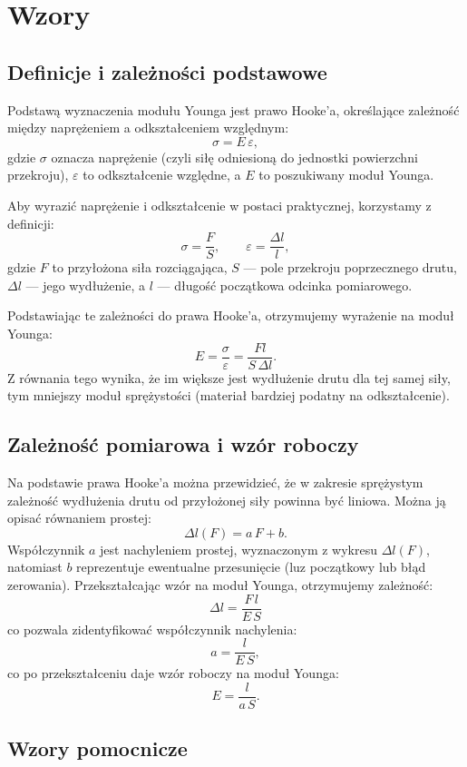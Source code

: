 \documentclass{fizykalab}
\begin{document}
\section{Wzory}

\subsection{Definicje i zależności podstawowe}

Podstawą wyznaczenia modułu Younga jest prawo Hooke'a, określające
zależność między naprężeniem a odkształceniem względnym:
$$
\sigma = E\,\varepsilon,
$$
gdzie \( \sigma \) oznacza naprężenie (czyli siłę odniesioną do jednostki
powierzchni przekroju), \( \varepsilon \) to odkształcenie względne, a
\( E \) to poszukiwany moduł Younga.

Aby wyrazić naprężenie i odkształcenie w postaci praktycznej,
korzystamy z definicji:
$$
\sigma = \frac{F}{S}, \qquad \varepsilon = \frac{\Delta l}{l},
$$
gdzie \( F \) to przyłożona siła rozciągająca, \( S \) — pole przekroju
poprzecznego drutu, \( \Delta l \) — jego wydłużenie, a \( l \) — długość
początkowa odcinka pomiarowego.

Podstawiając te zależności do prawa Hooke'a, otrzymujemy wyrażenie na
moduł Younga:
$$
E = \frac{\sigma}{\varepsilon}
= \frac{F l}{S\,\Delta l}.
$$
Z równania tego wynika, że im większe jest wydłużenie drutu dla tej samej
siły, tym mniejszy moduł sprężystości (materiał bardziej podatny na
odkształcenie).
\pagebreak

\subsection{Zależność pomiarowa i wzór roboczy}

Na podstawie prawa Hooke'a można przewidzieć, że w zakresie sprężystym
zależność wydłużenia drutu od przyłożonej siły powinna być liniowa.
Można ją opisać równaniem prostej:
$$
\Delta l(F) = a\,F + b.
$$
Współczynnik \( a \) jest nachyleniem prostej, wyznaczonym z wykresu
\(\Delta l(F)\), natomiast \( b \) reprezentuje ewentualne przesunięcie
(luz początkowy lub błąd zerowania).
Przekształcając wzór na moduł Younga, otrzymujemy zależność:
$$
\Delta l = \frac{F\,l}{E\,S}
$$
co pozwala zidentyfikować współczynnik nachylenia:
$$
a = \frac{l}{E\,S},
$$
co po przekształceniu daje wzór roboczy na moduł Younga:
$$
E = \frac{l}{a\,S}.
$$

\subsection{Wzory pomocnicze}
\end{document}
